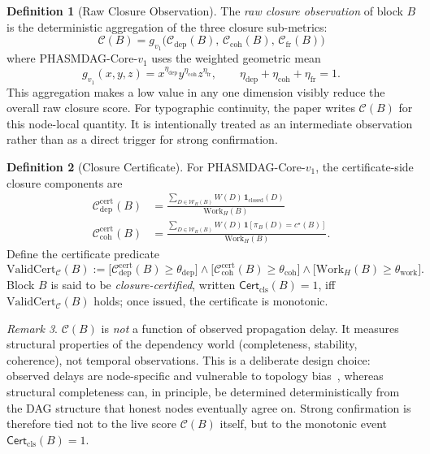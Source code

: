 \documentclass[11pt]{article}
\theoremstyle{definition}
\newtheorem{definition}{Definition}[section]
\theoremstyle{plain}
\theoremstyle{remark}
\newtheorem{remark}[definition]{Remark}
\newcommand{\Clvl}{\mathcal{C}}          %
\newcommand{\Cdep}{\mathcal{C}_{\mathrm{dep}}}
\newcommand{\Ccoh}{\mathcal{C}_{\mathrm{coh}}}
\newcommand{\Cfr}{\mathcal{C}_{\mathrm{fr}}}
\newcommand{\Cdepcert}{\mathcal{C}^{\mathrm{cert}}_{\mathrm{dep}}}
\newcommand{\Ccohcert}{\mathcal{C}^{\mathrm{cert}}_{\mathrm{coh}}}
\newcommand{\Certcls}{\mathsf{Cert}_{\mathrm{cls}}}
\begin{document}
\begin{definition}[Raw Closure Observation]\label{def:closure_level}
The \emph{raw closure observation} of block $B$ is the deterministic
aggregation of the three closure sub-metrics:
\begin{equation}\label{eq:closure_level}
\Clvl(B) = g_{v_1}\!\bigl(\Cdep(B),\,\Ccoh(B),\,\Cfr(B)\bigr)
\end{equation}
where PHASMDAG-Core-$v_1$ uses the weighted geometric mean
\begin{equation}\label{eq:closure_level_v1}
g_{v_1}(x,y,z) = x^{\eta_{\mathrm{dep}}}
y^{\eta_{\mathrm{coh}}}
z^{\eta_{\mathrm{fr}}},
\qquad
\eta_{\mathrm{dep}}+\eta_{\mathrm{coh}}+\eta_{\mathrm{fr}}=1.
\end{equation}
This aggregation makes a low value in any one dimension visibly reduce the
overall raw closure score.
For typographic continuity, the paper writes $\Clvl(B)$ for this node-local
quantity.
It is intentionally treated as an intermediate observation rather than as a
direct trigger for strong confirmation.
\end{definition}

\begin{definition}[Closure Certificate]\label{def:closure_certificate}
For PHASMDAG-Core-$v_1$, the certificate-side closure components are
\begin{align}
\Cdepcert(B)
&= 
\frac{\sum_{D \in \mathcal{W}_H(B)} W(D)\,\mathbf{1}_{\mathrm{closed}}(D)}
{\mathrm{Work}_H(B)}
\label{eq:cdep_cert} \\
\Ccohcert(B)
&= 
\frac{\sum_{D \in \mathcal{W}_H(B)} W(D)\,\mathbf{1}[\pi_B(D)=c^\star(B)]}
{\mathrm{Work}_H(B)}.
\label{eq:ccoh_cert}
\end{align}
Define the certificate predicate
\begin{equation}\label{eq:valid_cert}
\mathrm{ValidCert}_{\mathcal{C}}(B)
:=
\bigl[\Cdepcert(B) \ge \theta_{\mathrm{dep}}\bigr]
\wedge
\bigl[\Ccohcert(B) \ge \theta_{\mathrm{coh}}\bigr]
\wedge
\bigl[\mathrm{Work}_H(B) \ge \theta_{\mathrm{work}}\bigr].
\end{equation}
Block $B$ is said to be \emph{closure-certified}, written $\Certcls(B)=1$,
iff $\mathrm{ValidCert}_{\mathcal{C}}(B)$ holds; once issued, the certificate
is monotonic.
\end{definition}

\begin{remark}\label{rem:closure_vs_delay}
$\Clvl(B)$ is \emph{not} a function of observed propagation delay.
It measures structural properties of the dependency world (completeness,
stability, coherence), not temporal observations.
This is a deliberate design choice: observed delays are node-specific and
vulnerable to topology bias~\cite{wu2024security}, whereas structural
completeness can, in principle, be determined deterministically from the DAG
structure that honest nodes eventually agree on.
Strong confirmation is therefore tied not to the live score $\Clvl(B)$ itself,
but to the monotonic event $\Certcls(B)=1$.
\end{remark}
\end{document}
